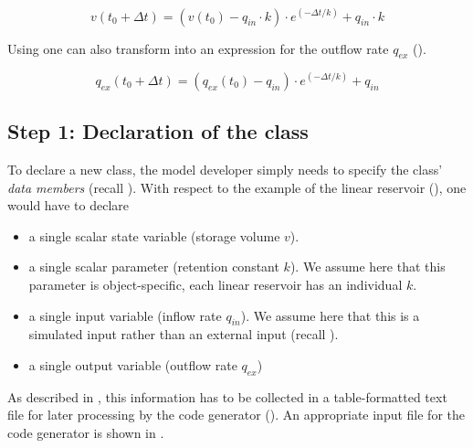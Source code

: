 \begin{equation} \label{eqn:concept-classDef-linReserv-solution-v}
v(t_0 + \Delta t) = \left( v(t_0) - q_{in} \cdot k \right) \cdot e^{(-\Delta t/k)} + q_{in} \cdot k
\end{equation}

Using  one can also transform  into an expression for the outflow rate $q_{ex}$ ().

\begin{equation} \label{eqn:concept-classDef-linReserv-solution-q}
q_{ex}(t_0 + \Delta t) = \left( q_{ex}(t_0) - q_{in} \right) \cdot e^{(-\Delta t/k)} + q_{in}
\end{equation}

\subsection{Step 1: Declaration of the class} \label{sec:concept-classDef-declaration}

To declare a new class, the model developer simply needs to specify the class' \emph{data members} (recall ). With respect to the example of the linear reservoir (), one would have to declare
\begin{itemize}
  \item a single scalar state variable (storage volume $v$).
  \item a single scalar parameter (retention constant $k$). We assume here that this parameter is object-specific, \ie{} each linear reservoir has an individual $k$.
  \item a single input variable (inflow rate $q_{in}$). We assume here that this is a simulated input rather than an external input (recall ).
  \item a single output variable (outflow rate $q_{ex}$)
\end{itemize}

As described in , this information has to be collected in a table-formatted text file for later processing by the code generator (). An appropriate input file for the code generator is shown in .

